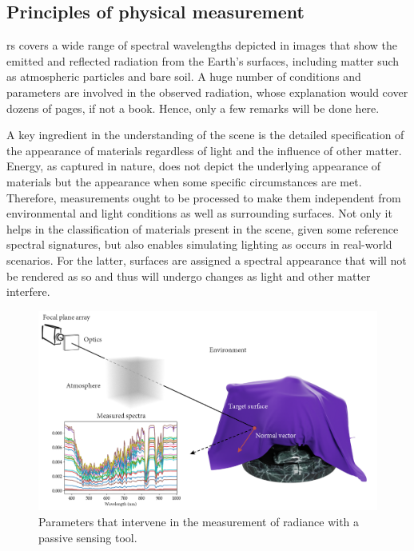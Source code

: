\subsection{Principles of physical measurement}

\acrshort{rs} covers a wide range of spectral wavelengths depicted in images that show the emitted and reflected radiation from the Earth's surfaces, including matter such as atmospheric particles and bare soil. A huge number of conditions and parameters are involved in the observed radiation, whose explanation would cover dozens of pages, if not a book. Hence, only a few remarks will be done here. 

A key ingredient in the understanding of the scene is the detailed specification of the appearance of materials regardless of light and the influence of other matter. Energy, as captured in nature, does not depict the underlying appearance of materials but the appearance when some specific circumstances are met. Therefore, measurements ought to be processed to make them independent from environmental and light conditions as well as surrounding surfaces. Not only it helps in the classification of materials present in the scene, given some reference spectral signatures, but also enables simulating lighting as occurs in real-world scenarios. For the latter, surfaces are assigned a spectral appearance that will not be rendered as so and thus will undergo changes as light and other matter interfere. 

\begin{figure}[bht]
	\includegraphics[width=\linewidth]{figs/fundamentals/physic_principles.png}
	\caption{Parameters that intervene in the measurement of radiance with a passive sensing tool. }
    \label{fig:physic_principles}
\end{figure}

